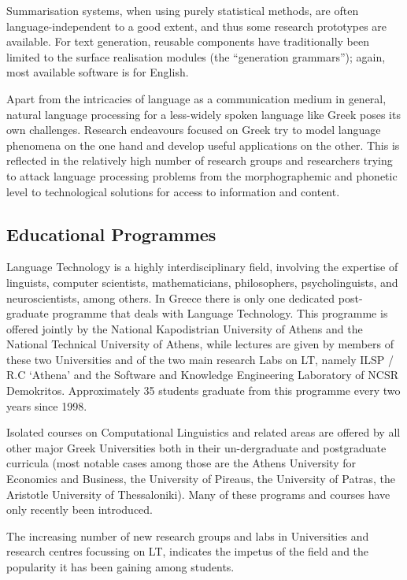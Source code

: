 \begin{multicols}{2}
Summarisation systems, when using purely statistical methods, are often language-independent to a good extent, and thus some research prototypes are available. For text generation, reusable components have traditionally been limited to the surface realisation modules (the “generation grammars”); again, most available software is for English.

Apart from the intricacies of language as a communication medium in general, natural language processing for a less-widely spoken language like Greek poses its own challenges. Research endeavours focused on Greek try to model language phenomena on the one hand and develop useful applications on the other. This is reflected in the relatively high number of research groups and researchers trying to attack language processing problems from the morphographemic and phonetic level to technological solutions for access to information and content.

\subsection{Educational Programmes}

Language Technology is a highly interdisciplinary field, involving the expertise of linguists, computer scientists, mathematicians, philosophers, psycholinguists, and neuroscientists, among others. In Greece there is only one dedicated post-graduate programme that deals with Language Technology. This programme is offered jointly by the National Kapodistrian University of Athens and the National Technical University of Athens, while lectures are given by members of these two Universities and of the two main research Labs on LT, namely ILSP / R.C ‘Athena’ and the Software and Knowledge Engineering Laboratory of NCSR Demokritos. Approximately 35 students graduate from this programme every two years since 1998.

Isolated courses on Computational Linguistics and related areas are offered by all other major Greek Universities both in their un-dergraduate and postgraduate curricula (most notable cases among those are the Athens University for Economics and Business, the University of Pireaus, the University of Patras, the Aristotle University of Thessaloniki). Many of these programs and courses have only recently been introduced.

The increasing number of new research groups and labs in Universities and research centres focussing on LT, indicates the impetus of the field and the popularity it has been gaining among students.


\end{multicols}
